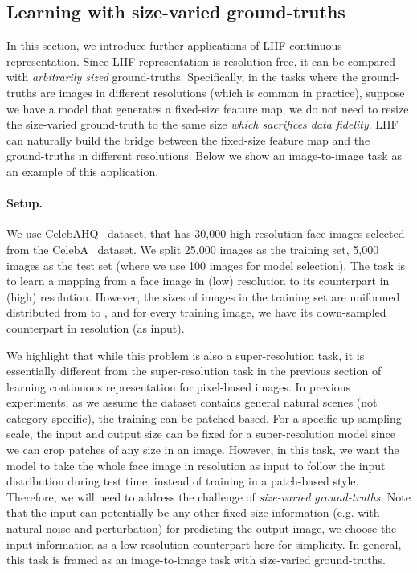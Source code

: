 \documentclass[final]{cvpr}
\begin{document}
\subsection{Learning with size-varied ground-truths}

In this section, we introduce further applications of LIIF continuous representation. Since LIIF representation is resolution-free, it can be compared with \emph{arbitrarily sized} ground-truths. Specifically, in the tasks where the ground-truths are images in different resolutions (which is common in practice), suppose we have a model that generates a fixed-size feature map, we do not need to resize the size-varied ground-truth to the same size \emph{which sacrifices data fidelity}. LIIF can naturally build the bridge between the fixed-size feature map and the ground-truths in different resolutions. Below we show an image-to-image task as an example of this application.

\vspace{-1em}
\paragraph{Setup.} We use CelebAHQ~\cite{karras2017progressive} dataset, that has 30,000 high-resolution face images selected from the CelebA~\cite{liu2015deep} dataset. We split 25,000 images as the training set, 5,000 images as the test set (where we use 100 images for model selection). The task is to learn a mapping from a face image in  (low) resolution to its counterpart in  (high) resolution. However, the sizes of images in the training set are uniformed distributed from  to , and for every training image, we have its down-sampled counterpart in  resolution (as input).

We highlight that while this problem is also a super-resolution task, it is essentially different from the super-resolution task in the previous section of learning continuous representation for pixel-based images. In previous experiments, as we assume the dataset contains general natural scenes (not category-specific), the training can be patched-based. For a specific up-sampling scale, the input and output size can be fixed for a super-resolution model since we can crop patches of any size in an image. However, in this task, we want the model to take the whole face image in  resolution as input to follow the input distribution during test time, instead of training in a patch-based style. Therefore, we will need to address the challenge of \emph{size-varied ground-truths}. Note that the input can potentially be any other fixed-size information (e.g. with natural noise and perturbation) for predicting the output image, we choose the input information as a  low-resolution counterpart here for simplicity. In general, this task is framed as an image-to-image task with size-varied ground-truths.
\end{document}
